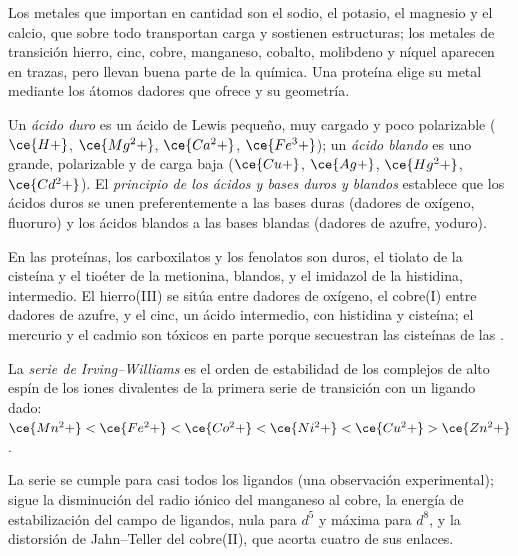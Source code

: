 Los metales que importan en cantidad son el sodio, el potasio, el magnesio y el
calcio, que sobre todo transportan carga y sostienen estructuras; los metales de transición
hierro, cinc, cobre, manganeso, cobalto, molibdeno y níquel aparecen en trazas,
pero llevan buena parte de la química. Una proteína elige su metal mediante los átomos
dadores que ofrece y su geometría.

\begin{definition}\label{def:b3:bioinorganic:hsab}
Un \emph{ácido duro} es un ácido de Lewis pequeño, muy cargado y poco
polarizable ($\ce{H+}$, $\ce{Mg^2+}$, $\ce{Ca^2+}$, $\ce{Fe^3+}$); un \emph{ácido
blando} es uno grande, polarizable y de carga baja ($\ce{Cu+}$, $\ce{Ag+}$,
$\ce{Hg^2+}$, $\ce{Cd^2+}$). El \emph{principio de los ácidos y bases duros y blandos}
establece que los ácidos duros se unen preferentemente a las bases duras
(dadores de oxígeno, fluoruro) y los ácidos blandos a las bases blandas (dadores de azufre, yoduro).
\end{definition}

En las proteínas, los carboxilatos y los fenolatos son duros, el tiolato de la cisteína y
el tioéter de la metionina, blandos, y el imidazol de la histidina, intermedio. El hierro(III)
se sitúa entre dadores de oxígeno, el cobre(I) entre dadores de azufre, y el cinc, un ácido
intermedio, con histidina y cisteína; el mercurio y el cadmio son tóxicos en parte
porque secuestran las cisteínas de las .

\begin{definition}\label{def:b3:bioinorganic:irving-williams}
La \emph{serie de Irving--Williams} es el orden
de estabilidad de los complejos de alto espín de los iones divalentes de la primera
serie de transición con un ligando dado:
$\ce{Mn^2+} < \ce{Fe^2+} < \ce{Co^2+} < \ce{Ni^2+} < \ce{Cu^2+} > \ce{Zn^2+}$.
\end{definition}

\begin{proposition}\label{prop:b3:bioinorganic:irving-williams}
La serie se cumple para casi todos los ligandos (una observación experimental); sigue
la disminución del radio iónico del manganeso al cobre, la energía de estabilización
del campo de ligandos, nula para $d^5$ y máxima para $d^8$, y la distorsión
de Jahn--Teller del cobre(II), que acorta cuatro de sus enlaces.
\end{proposition}

